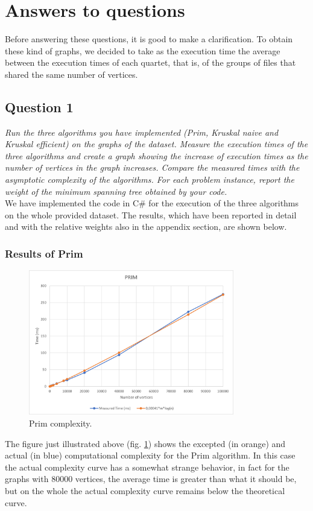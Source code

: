 \section{Answers to questions}

Before answering these questions, it is good to make a clarification. To obtain these kind of graphs, 
we decided to take as the execution time the average between the execution times of each quartet, that is, 
of the groups of files that shared the same number of vertices.

\subsection{Question 1}
\textit{Run the three algorithms you have implemented (Prim, Kruskal naive and Kruskal efficient) on the 
graphs of the dataset. Measure the execution times of the three algorithms and create a graph showing the 
increase of execution times as the number of vertices in the graph increases. Compare the measured times 
with the asymptotic complexity of the algorithms. For each problem instance, report the weight of the minimum 
spanning tree obtained by your code.} \\

\noindent
We have implemented the code in C\# for the execution of the three algorithms on the whole provided dataset. 
The results, which have been reported in detail and with the relative weights also in the appendix section, 
are shown below.

\subsubsection{Results of Prim}
\begin{figure}[H]
    \centering
    \includegraphics[width=0.8\textwidth]{./img/Prim.png}
    \caption{Prim complexity.}
    \label{fig:prim}
\end{figure}
The figure just illustrated above (fig. \ref{fig:prim}) shows the excepted (in orange) and actual (in blue) 
computational complexity for the Prim algorithm. In this case the actual complexity 
curve has a somewhat strange behavior, in fact for the graphs with 80000 vertices, the average time is greater than 
what it should be, but on the whole the actual complexity curve remains below the theoretical curve.

